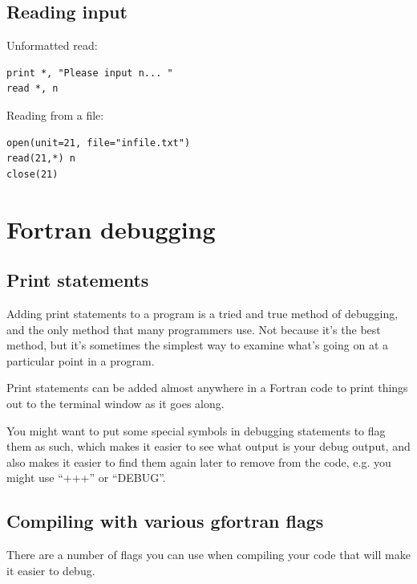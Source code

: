 \documentclass[letterpaper,10pt,english]{sphinxmanual}
\begin{document}
\subsection{Reading input}
\label{fortran_io:reading-input}
Unformatted read:

\begin{Verbatim}[commandchars=\\\{\}]
print *, "Please input n... "
read *, n
\end{Verbatim}

Reading from a file:

\begin{Verbatim}[commandchars=\\\{\}]
open(unit=21, file="infile.txt")
read(21,*) n
close(21)
\end{Verbatim}


\section{Fortran debugging}
\label{fortran_debugging:fortran-debugging}\label{fortran_debugging::doc}\label{fortran_debugging:id1}

\subsection{Print statements}
\label{fortran_debugging:print-statements}
Adding print statements to a program is a tried and true method of
debugging, and the only method that many programmers use.
Not because it's the best method, but it's sometimes the simplest way to
examine what's going on at a particular point in a program.

Print statements can be added almost anywhere in a Fortran code to print
things out to the terminal window as it goes along.

You might want to put some special symbols in debugging statements to flag
them as such, which makes it easier to see what output is your debug output,
and also makes it easier to find them again later to remove from the code,
e.g. you might use ``+++'' or ``DEBUG''.


\subsection{Compiling with various gfortran flags}
\label{fortran_debugging:compiling-with-various-gfortran-flags}
There are a number of flags you can use when compiling your code that will
make it easier to debug.
\end{document}
